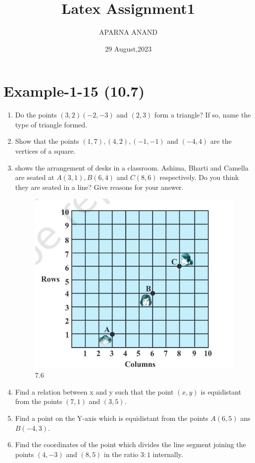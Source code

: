 \documentclass{article}
\theoremstyle{remark}
\begin{document}
\title{Latex Assignment1}
\author{APARNA ANAND}
\date{29 August,2023}
\maketitle
\section*{Example-1-15 (10.7)}
\begin{enumerate}
\item Do the points $(3,2)(-2,-3)$ and $(2,3)$ form a triangle? If so, name the type of triangle formed.
\item Show that the points $(1,7),(4,2),(-1,-1)$ and $(-4,4)$ are the vertices of a square.
\item {} shows the arrangement of desks in a classroom. Ashima, Bharti and Camella are seated at $A(3,1),B(6,4)$ and $C(8,6)$ respectively. Do you think they are seated in a line? Give reasons for your answer.
\begin{figure}[h]
\centering 
\includegraphics[width=\columnwidth]{figs/7.6.png}
\caption{7.6}
\label{fig:7.6}
\end{figure}
\item Find a relation between x and y such that the point $(x,y)$ is equidistant from the points $(7,1)$ and $(3,5)$.
\item Find a point on the Y-axis which is equidistant from the points $A(6,5)$ ans $B(-4,3)$.
\item Find the coordinates of the point which divides the line segment joining the points $(4,-3)$ and $(8,5)$ in the ratio $3:1$ internally.

\end{enumerate}
\end{document}
